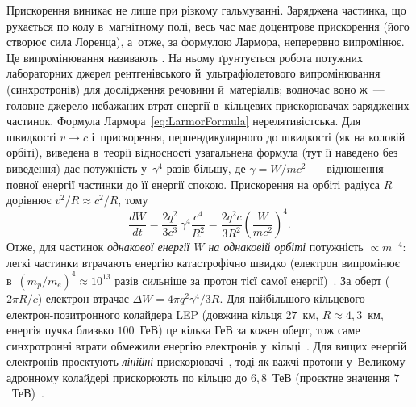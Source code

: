 Прискорення виникає не лише при різкому гальмуванні. Заряджена частинка, що рухається
по колу в~магнітному полі, весь час має доцентрове прискорення (його створює сила Лоренца),
а~отже, за формулою Лармора, неперервно випромінює. Це випромінювання називають
. На ньому ґрунтується робота потужних лабораторних джерел рентгенівського й~ультрафіолетового
випромінювання (синхротронів) для дослідження речовини й~матеріалів; водночас воно ж~---
головне джерело небажаних втрат енергії в~кільцевих прискорювачах заряджених частинок.
Формула Лармора~\eqref{eq:LarmorFormula} нерелятивістська. Для швидкості $v\to c$ і~прискорення, перпендикулярного до
швидкості (як на коловій орбіті), виведена в~теорії відносності узагальнена формула (тут її
наведено без виведення) дає потужність у~$\gamma^4$ разів більшу, де $\gamma=W/mc^2$~---
відношення повної енергії частинки до її енергії спокою. Прискорення на орбіті радіуса $R$
дорівнює $v^2/R\approx c^2/R$, тому
\begin{equation}\label{eq:SynchrotronPower}
	\frac{dW}{dt}=\frac{2q^2}{3c^3}\,\gamma^4\frac{c^4}{R^2}=\frac{2q^2c}{3R^2}\left(\frac{W}{mc^2}\right)^{\!4}.
\end{equation}
Отже, для частинок \emph{однакової енергії $W$ на однаковій орбіті} потужність
$\propto m^{-4}$: легкі частинки втрачають енергію катастрофічно швидко (електрон випромінює
в~$(m_p/m_e)^4\approx10^{13}$ разів сильніше за протон тієї самої енергії)~\cite{Wiedemann2015ParticleAccel}.
За оберт ($2\pi R/c$) електрон втрачає $\Delta W=4\pi q^2\gamma^4/3R$. Для найбільшого кільцевого
електрон-позитронного колайдера LEP (довжина кільця $27$~км, $R\approx4{,}3$~км, енергія пучка
близько $100$~ГеВ) це кілька ГеВ за кожен оберт, тож саме синхротронні втрати обмежили енергію
електронів у~кільці~\cite{Myers1990LEP}. Для вищих енергій електронів проєктують \emph{лінійні}
прискорювачі~\cite{ILCTDR2013}, тоді як важчі протони у~Великому адронному колайдері прискорюють
по кільцю до $6{,}8$~ТеВ (проєктне значення $7$~ТеВ)~\cite{Evans2008LHC}.

